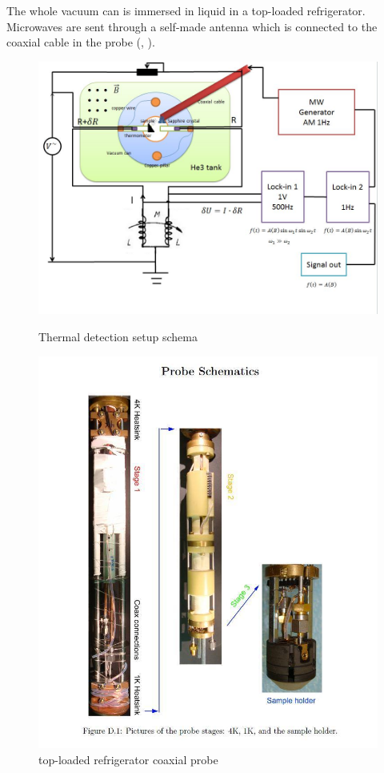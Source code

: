 \documentclass[12pt]{ruthesis}
\begin{document}
The whole vacuum can is immersed in liquid  in a top-loaded refrigerator.
Microwaves are sent through a self-made antenna which is connected to the coaxial cable in the probe (, )\cite{KrisThesis}.
 

\begin{figure}[!htb]\centering
   \begin{minipage}{0.49\textwidth}
     \includegraphics[width=\linewidth]{figures/SCHEME.JPG}
     \caption{Thermal detection setup schema}\label{thermal-schema}
   \end{minipage}
   \begin {minipage}{0.49\textwidth}
     \includegraphics[width=\linewidth]{figures/probe.JPG}
     \caption{ top-loaded refrigerator coaxial probe}\label{probe}
   \end{minipage}
\end{figure}
\end{document}
